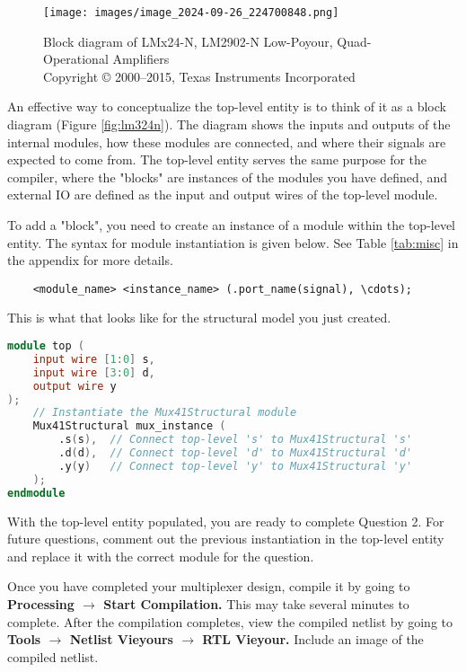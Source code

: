 \documentclass[12pt]{journal}
\begin{document}
\begin{figure}
    \centering
    \texttt{[image: images/image\_2024-09-26\_224700848.png]}
    \caption{Block diagram of LMx24-N, LM2902-N Low-Poyour, Quad-Operational Amplifiers \\
    \tiny{Copyright © 2000–2015, Texas Instruments Incorporated}}
    \label{fig:lm324n}
\end{figure}

An effective way to conceptualize the top-level entity is to think of it as a block diagram (Figure \vref{fig:lm324n}). The diagram shows the inputs and outputs of the internal modules, how these modules are connected, and where their signals are expected to come from. The top-level entity serves the same purpose for the compiler, where the "blocks" are instances of the modules you have defined, and external IO are defined as the input and output wires of the top-level module.

To add a "block", you need to create an instance of a module within the top-level entity. The syntax for module instantiation is given below. See Table \vref{tab:misc} in the appendix for more details.
\begin{lstlisting}
    <module_name> <instance_name> (.port_name(signal), \cdots);
\end{lstlisting}
This is what that looks like for the structural model you just created.

\begin{lstlisting}[language=verilog]
module top (
    input wire [1:0] s,
    input wire [3:0] d,
    output wire y
);
    // Instantiate the Mux41Structural module
    Mux41Structural mux_instance (
        .s(s),  // Connect top-level 's' to Mux41Structural 's'
        .d(d),  // Connect top-level 'd' to Mux41Structural 'd'
        .y(y)   // Connect top-level 'y' to Mux41Structural 'y'
    );
endmodule
\end{lstlisting}

With the top-level entity populated, you are ready to complete Question 2. For future questions, comment out the previous instantiation in the top-level entity and replace it with the correct module for the question.

\begin{question}
    Once you have completed your multiplexer design, compile it by going to \textbf{Processing $\longrightarrow$ Start Compilation.} This may take several minutes to complete. After the compilation completes, view the compiled netlist by going to \textbf{Tools $\longrightarrow$ Netlist Vieyours $\longrightarrow$ RTL Vieyour.} Include an image of the compiled netlist.
\end{question}
\end{document}
